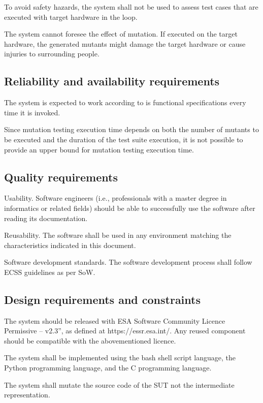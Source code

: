 \RQ{} To avoid safety hazards, the system shall not be used to assess test cases that are executed with target hardware in the loop.

\RQ{} The system cannot foresee the effect of mutation. If executed on the target hardware, the generated mutants might damage the target hardware or cause injuries to surrounding people.

\subsection{Reliability and availability requirements}

\RQ{} The system is expected to work according to is functional specifications every time it is invoked.

\RQ{} Since mutation testing execution time depends on both the number of mutants to be executed and the duration of the test suite execution, it is not possible to provide an upper bound for mutation testing execution time.

\subsection{Quality requirements}

\RQ{} Usability. Software engineers (i.e., professionals with a master degree in informatics or related fields) should be able to successfully use the software after reading its documentation.

\RQ{} Reusability. The software shall be used in any environment matching the characteristics indicated in this document.

\RQ{} Software development standards. The software development process shall follow ECSS guidelines as per SoW.

\subsection{Design requirements and constraints}

\RQ{} The system should be released with ESA Software Community Licence Permissive – v2.3”, as defined at https://essr.esa.int/. Any reused component should be compatible with the abovementioned licence.

\RQ{} The system shall be implemented using the bash shell script language, the Python programming language, and the C programming language.

\RQ{} The system shall mutate the source code of the SUT not the intermediate representation.

